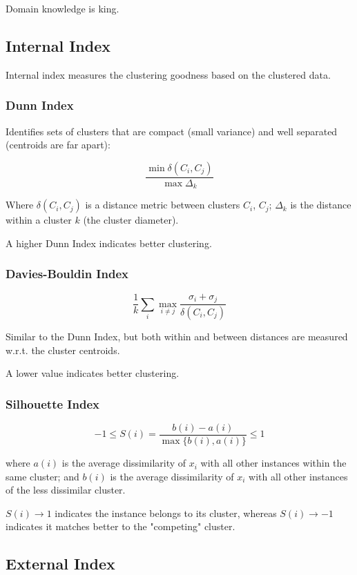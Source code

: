 \documentclass{idc_msc}
\begin{document}
Domain knowledge is king.

\subsection{Internal Index}

Internal index measures the clustering goodness based on the clustered data.

\subsubsection{Dunn Index}

Identifies sets of clusters that are compact (small variance) and well separated (centroids are far apart):

\[
  \frac{\min \delta(C_i, C_j)}{\max \Delta_k}
\]

Where \(\delta(C_i, C_j)\) is a distance metric between clusters \(C_i\), \(C_j\); \(\Delta_k\) is the distance within a cluster \(k\) (the cluster diameter).

A higher Dunn Index indicates better clustering.

\subsubsection{Davies-Bouldin Index}

\[
  \frac{1}{k} \sum_i \max_{i \ne j} \frac{\sigma_i + \sigma_j}{\delta(C_i, C_j)}
\]

Similar to the Dunn Index, but both within and between distances are measured w.r.t. the cluster centroids.

A lower value indicates better clustering.

\subsubsection{Silhouette Index}

\[-1 \le S(i) = \frac{b(i) - a(i)}{\max\{b(i), a(i)\}} \le 1\]

where \(a(i)\) is the average dissimilarity of \(x_i\) with all other instances within the same cluster;
and \(b(i)\) is the average dissimilarity of \(x_i\) with all other instances of the less dissimilar cluster.

\(S(i) \to 1\) indicates the instance belongs to its cluster, whereas \(S(i) \to -1\) indicates it matches better to the "competing" cluster.

\subsection{External Index}
\end{document}

